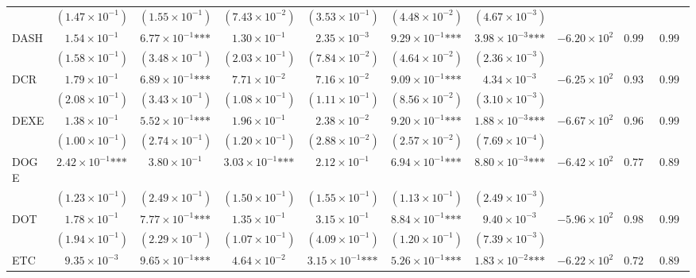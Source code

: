 \documentclass{article}
\begin{document}
\begin{landscape}
\begin{longtable}{lccccccccc}
 & $(1.47\times 10^{-1})$ & $(1.55\times 10^{-1})$ & $(7.43\times 10^{-2})$ & $(3.53\times 10^{-1})$ & $(4.48\times 10^{-2})$ & $(4.67\times 10^{-3})$ &  &  &  \\
DASH & $1.54\times 10^{-1}$ & $6.77\times 10^{-1}\text{***}$ & $1.30\times 10^{-1}$ & $2.35\times 10^{-3}$ & $9.29\times 10^{-1}\text{***}$ & $3.98\times 10^{-3}\text{***}$ & $-6.20\times 10^{2}$ & $0.998$ & $0.999$ \\
 & $(1.58\times 10^{-1})$ & $(3.48\times 10^{-1})$ & $(2.03\times 10^{-1})$ & $(7.84\times 10^{-2})$ & $(4.64\times 10^{-2})$ & $(2.36\times 10^{-3})$ &  &  &  \\
DCR & $1.79\times 10^{-1}$ & $6.89\times 10^{-1}\text{***}$ & $7.71\times 10^{-2}$ & $7.16\times 10^{-2}$ & $9.09\times 10^{-1}\text{***}$ & $4.34\times 10^{-3}$ & $-6.25\times 10^{2}$ & $0.930$ & $0.990$ \\
 & $(2.08\times 10^{-1})$ & $(3.43\times 10^{-1})$ & $(1.08\times 10^{-1})$ & $(1.11\times 10^{-1})$ & $(8.56\times 10^{-2})$ & $(3.10\times 10^{-3})$ &  &  &  \\
DEXE & $1.38\times 10^{-1}$ & $5.52\times 10^{-1}\text{***}$ & $1.96\times 10^{-1}$ & $2.38\times 10^{-2}$ & $9.20\times 10^{-1}\text{***}$ & $1.88\times 10^{-3}\text{***}$ & $-6.67\times 10^{2}$ & $0.968$ & $0.990$ \\
 & $(1.00\times 10^{-1})$ & $(2.74\times 10^{-1})$ & $(1.20\times 10^{-1})$ & $(2.88\times 10^{-2})$ & $(2.57\times 10^{-2})$ & $(7.69\times 10^{-4})$ &  &  &  \\
DOGE & $2.42\times 10^{-1}\text{***}$ & $3.80\times 10^{-1}$ & $3.03\times 10^{-1}\text{***}$ & $2.12\times 10^{-1}$ & $6.94\times 10^{-1}\text{***}$ & $8.80\times 10^{-3}\text{***}$ & $-6.42\times 10^{2}$ & $0.772$ & $0.891$ \\
 & $(1.23\times 10^{-1})$ & $(2.49\times 10^{-1})$ & $(1.50\times 10^{-1})$ & $(1.55\times 10^{-1})$ & $(1.13\times 10^{-1})$ & $(2.49\times 10^{-3})$ &  &  &  \\
DOT & $1.78\times 10^{-1}$ & $7.77\times 10^{-1}\text{***}$ & $1.35\times 10^{-1}$ & $3.15\times 10^{-1}$ & $8.84\times 10^{-1}\text{***}$ & $9.40\times 10^{-3}$ & $-5.96\times 10^{2}$ & $0.987$ & $0.992$ \\
 & $(1.94\times 10^{-1})$ & $(2.29\times 10^{-1})$ & $(1.07\times 10^{-1})$ & $(4.09\times 10^{-1})$ & $(1.20\times 10^{-1})$ & $(7.39\times 10^{-3})$ &  &  &  \\
ETC & $9.35\times 10^{-3}$ & $9.65\times 10^{-1}\text{***}$ & $4.64\times 10^{-2}$ & $3.15\times 10^{-1}\text{***}$ & $5.26\times 10^{-1}\text{***}$ & $1.83\times 10^{-2}\text{***}$ & $-6.22\times 10^{2}$ & $0.726$ & $0.891$ \\

\end{longtable}
\end{landscape}
\end{document}

